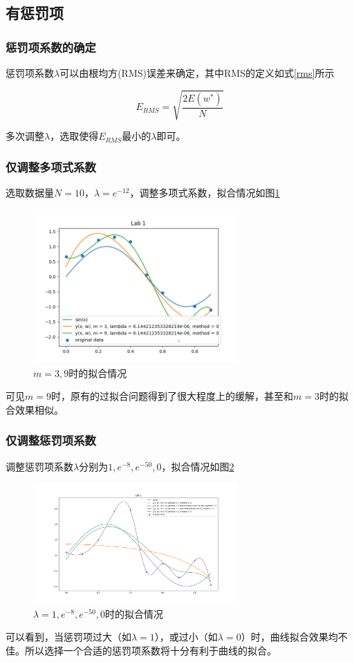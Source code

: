 \subsection{有惩罚项}

\subsubsection{惩罚项系数的确定}

惩罚项系数$\lambda$可以由根均方(RMS)误差\cite{ref3}来确定，其中RMS的定义如式\eqref{rms}所示

\begin{equation}
    E_{RMS} = \sqrt{\dfrac{2E(w^*)}{N}}
    \label{rms}
\end{equation}

多次调整$\lambda$，选取使得$E_{RMS}$最小的$\lambda$即可。

\subsubsection{仅调整多项式系数}

选取数据量$N = 10$，$\lambda = e^{-12}$，调整多项式系数，拟合情况如图\ref{m39}

\begin{figure}
    \centering
    \includegraphics[width=0.7\textwidth]{figures/Figure_9.png}
    \caption{$m = 3, 9$时的拟合情况}
    \label{m39}
\end{figure}

可见$m = 9$时，原有的过拟合问题得到了很大程度上的缓解，甚至和$m = 3$时的拟合效果相似。

\subsubsection{仅调整惩罚项系数}

调整惩罚项系数$\lambda$分别为$1, e^{-8}, e^{-50}, 0$，拟合情况如图\ref{lam}

\begin{figure}
    \centering
    \includegraphics[width=0.7\textwidth]{figures/Figure_10.png}
    \caption{$\lambda = 1, e^{-8}, e^{-50}, 0$时的拟合情况}
    \label{lam}
\end{figure}

可以看到，当惩罚项过大（如$\lambda = 1$），或过小（如$\lambda = 0$）时，曲线拟合效果均不佳。所以选择一个合适的惩罚项系数将十分有利于曲线的拟合。
